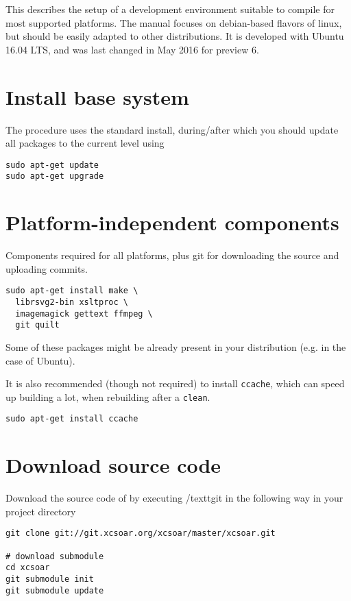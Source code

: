 This describes the setup of a development environment suitable to compile \xc for most supported platforms. The manual focuses on debian-based flavors of linux, but should be easily adapted to other distributions. It is developed with Ubuntu 16.04 LTS, and was last changed in May 2016 for  preview  6.

\section{Install base system}\label{sec:developsetup-base}
The procedure uses the standard install, during/after which you should update all packages to the current level using

\begin{verbatim}
sudo apt-get update
sudo apt-get upgrade
\end{verbatim}

\section{Platform-independent components}\label{sec:developsetup-general}

Components required for all platforms, plus git for downloading the source and uploading commits.

\begin{verbatim}
sudo apt-get install make \
  librsvg2-bin xsltproc \
  imagemagick gettext ffmpeg \
  git quilt
\end{verbatim}
Some of these packages might be already present in your distribution (e.g. in the case of Ubuntu).

It is also recommended (though not required) to install \texttt{ccache}, which can speed up building a lot, when rebuilding after a \texttt{clean}.
\begin{verbatim}
sudo apt-get install ccache
\end{verbatim}


\section{Download source code}\label{sec:developsetup-sourcecode}

Download the source code of \xc by executing /textt{git} in the following way in your project directory
\begin{verbatim}
git clone git://git.xcsoar.org/xcsoar/master/xcsoar.git

# download submodule
cd xcsoar
git submodule init
git submodule update
\end{verbatim}

